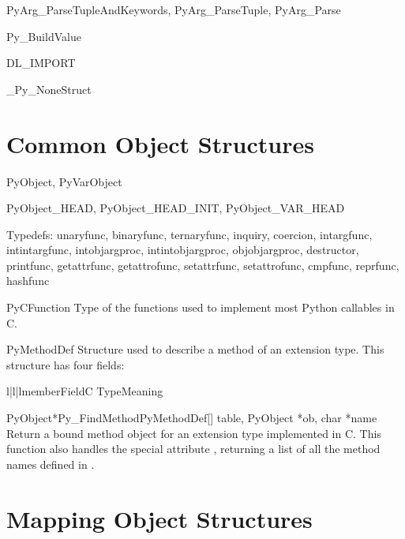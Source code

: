 \documentclass{manual}
\begin{document}
PyArg_ParseTupleAndKeywords, PyArg_ParseTuple, PyArg_Parse

Py_BuildValue

DL_IMPORT

_Py_NoneStruct


\section{Common Object Structures \label{common-structs}}

PyObject, PyVarObject

PyObject_HEAD, PyObject_HEAD_INIT, PyObject_VAR_HEAD

Typedefs:
unaryfunc, binaryfunc, ternaryfunc, inquiry, coercion, intargfunc,
intintargfunc, intobjargproc, intintobjargproc, objobjargproc,
destructor, printfunc, getattrfunc, getattrofunc, setattrfunc,
setattrofunc, cmpfunc, reprfunc, hashfunc

\begin{ctypedesc}{PyCFunction}
Type of the functions used to implement most Python callables in C.
\end{ctypedesc}

\begin{ctypedesc}{PyMethodDef}
Structure used to describe a method of an extension type.  This
structure has four fields:

\begin{tableiii}{l|l|l}{member}{Field}{C Type}{Meaning}
\end{tableiii}
\end{ctypedesc}

\begin{cfuncdesc}{PyObject*}{Py_FindMethod}{PyMethodDef[] table,
                                            PyObject *ob, char *name}
Return a bound method object for an extension type implemented in C.
This function also handles the special attribute ,
returning a list of all the method names defined in .
\end{cfuncdesc}


\section{Mapping Object Structures \label{mapping-structs}}
\end{document}
